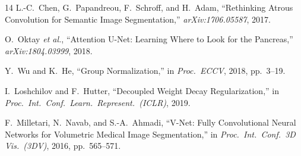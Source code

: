 \documentclass[conference]{IEEEtran}
\begin{document}
\begin{thebibliography}{14}
L.-C.~Chen, G.~Papandreou, F.~Schroff, and H.~Adam, ``Rethinking Atrous
Convolution for Semantic Image Segmentation,'' \emph{arXiv:1706.05587},
2017.

O.~Oktay \emph{et al.}, ``Attention U-Net: Learning Where to Look for the
Pancreas,'' \emph{arXiv:1804.03999}, 2018.

Y.~Wu and K.~He, ``Group Normalization,'' in \emph{Proc.\ ECCV}, 2018,
pp.~3--19.

I.~Loshchilov and F.~Hutter, ``Decoupled Weight Decay Regularization,''
in \emph{Proc.\ Int.\ Conf.\ Learn.\ Represent.\ (ICLR)}, 2019.

F.~Milletari, N.~Navab, and S.-A.~Ahmadi, ``V-Net: Fully Convolutional
Neural Networks for Volumetric Medical Image Segmentation,'' in
\emph{Proc.\ Int.\ Conf.\ 3D Vis.\ (3DV)}, 2016, pp.~565--571.

\end{thebibliography}
\end{document}

